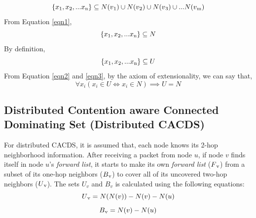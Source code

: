 \begin{equation}
    \{x\textsubscript{1},x\textsubscript{2},...x\textsubscript{n}\} \subseteq N(v\textsubscript{1}) \cup N(v\textsubscript{2}) \cup N(v\textsubscript{3}) \cup ... N(v\textsubscript{m}) 
    \label{eqn1}
\end{equation} 
From Equation \ref{eqn1},
\begin{equation}
   \{x\textsubscript{1},x\textsubscript{2},...x\textsubscript{n}\} \subseteq N
   \label{eqn2}
\end{equation}
By definition,
\begin{equation}
    \{x\textsubscript{1},x\textsubscript{2},...x\textsubscript{n}\} \subseteq U
    \label{eqn3}
    \end{equation}
 From Equation \ref{eqn2} and \ref{eqn3}, by the axiom of extensionality, we can say that, \\  
    \begin{equation}
\forall x_i (x_i \in U \Longleftrightarrow x_i \in N) \implies U = N
 \end{equation}

\subsection {Distributed Contention aware Connected Dominating Set (Distributed CACDS)}

For distributed CACDS, it is assumed that, each node knows its 2-hop neighborhood information. After receiving a packet from node $u$, if node $v$ finds itself in node $u$'s \textit{forward list}, it starts to make its own \textit{forward list} ($F\textsubscript{v}$) from a subset of its one-hop neighbors ($B\textsubscript{v}$) to cover all of its uncovered two-hop neighbors ($U\textsubscript{v}$). The sets $U_v$ and $B_v$ is calculated using the following equations:
$$U\textsubscript{v} = N(N(v)) - N(v) - N(u)$$
$$B\textsubscript{v} = N (v)- N (u) $$

